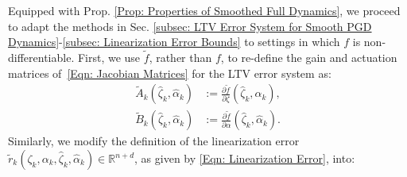 \documentclass[letterpaper, 10 pt, conference]{ieeeconf}
\newcommand{\R}{\mathbb{R}}
\newcommand{\?}{\stackrel{?}{=}}
\newcommand{\param}{\theta}
\newcommand{\paramDim}{d}
\newcommand{\var}{\xi}
\newcommand{\varDim}{n}
\newcommand{\ratePGDNominal}{\hat\ratePGD}
\newcommand{\linearizationError}{r}
\newcommand{\linearizationErrorSmoothed}{\tilde{\linearizationError}}
\newcommand{\ratePGD}{\alpha}
\newcommand{\jacobianState}{A}
\newcommand{\jacobianControl}{B}
\newcommand{\jacobianStateSmoothed}{\tilde{\jacobianState}}
\newcommand{\jacobianControlSmoothed}{\tilde{\jacobianControl}}
\newcommand{\state}{\zeta}
\newcommand{\stateNominal}{\hat\state}
\newcommand{\dynamicsFullState}{f}
\newcommand{\hessianBound}{\mu}
\newcommand{\hessianBoundSmoothed}{\tilde{\hessianBound}}
\newcommand{\dynamicsFullStateSmoothed}{{\tilde{\dynamicsFullState}}}
\newcommand{\lipschitz}{\ell}
\newtheorem{remark}{Remark}
\begin{document}

Equipped with
Prop. \ref{Prop: Properties of Smoothed Full Dynamics}, we proceed to adapt the methods in Sec. \ref{subsec: LTV Error System for Smooth PGD Dynamics}-\ref{subsec: Linearization Error Bounds} to settings in which $\dynamicsFullState$ is non-differentiable.
First, we use $\dynamicsFullStateSmoothed$, rather than $\dynamicsFullState$, to re-define the gain and actuation matrices of~\eqref{Eqn: Jacobian Matrices} for the LTV error system as:
{
\setlength{\abovedisplayskip}{3.5pt}
\setlength{\belowdisplayskip}{3.5pt}
\begin{subequations}
\label{Eqn: Jacobian Matrices, with Smoothed Dynamics}
\begin{align}
\label{Eqn: Jacobian Matrix, State, with Smoothed Dynamics}
    \jacobianStateSmoothed_k(\stateNominal_k, \ratePGDNominal_k) &:= \textstyle\frac{\partial \dynamicsFullStateSmoothed}{\partial \state}(\stateNominal_k, \ratePGDNominal_k), \\
    \label{Eqn: Jacobian Matrix, Control, with Smoothed Dynamics}
    \jacobianControlSmoothed_k(\stateNominal_k, \ratePGDNominal_k) &:= \textstyle\frac{\partial \dynamicsFullStateSmoothed}{\partial \ratePGD}(\stateNominal_k, \ratePGDNominal_k).
\end{align}
\end{subequations}
}
\hspace{-1mm}Similarly, we modify the definition of the linearization error $\linearizationErrorSmoothed_k(\state_k, \ratePGD_k, \stateNominal_k, \ratePGDNominal_k) \in \R^{\varDim + \paramDim}$, as given by \eqref{Eqn: Linearization Error}, into:
\end{document}
